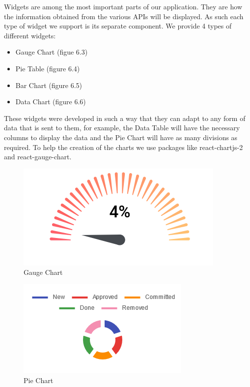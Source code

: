 \documentclass[a4paper,twoside,10pt]{report}
\begin{document}
Widgets are among the most important parts of our application. They are how the information obtained from the various APIs will be displayed.
\newline
As such each type of widget we support is its separate component. 
\newline
We provide 4 types of different widgets:
 \begin{itemize}
	\item Gauge Chart (figue 6.3)
	\item Pie Table (figure 6.4)
	\item Bar Chart (figure 6.5)
	\item Data Chart (figure 6.6)
\end{itemize}
These widgets were developed in such a way that they can adapt to any form of data that is sent to them, for example, the Data Table will have the necessary columns to display the data and the Pie Chart will have as many divisions as required. To help the creation of the charts we use packages like react-chartjs-2 and react-gauge-chart.

\begin{figure}[h!]
\center
  \includegraphics[]{gauge-chart.png}
\caption{Gauge Chart}
\end{figure}

\begin{figure}[h!]
\center
  \includegraphics[]{pie-chart.png}
\caption{Pie Chart}
\end{figure}

\newpage
\end{document}
